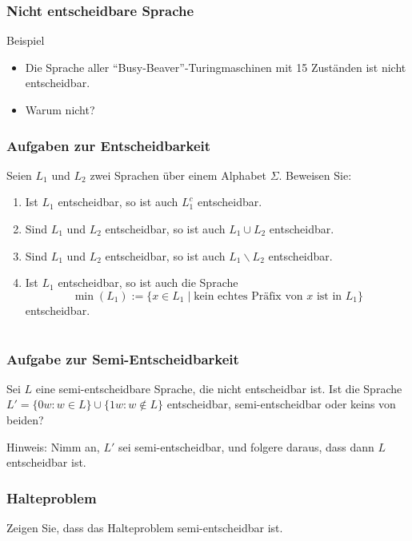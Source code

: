 \documentclass{beamer}
\begin{document}
\begin{frame}
 \frametitle{Nicht entscheidbare Sprache}
 \begin{block}{Beispiel}
 \begin{itemize}
  \item Die Sprache aller ``Busy-Beaver''-Turingmaschinen mit 15 Zuständen ist nicht entscheidbar.
  \item Warum nicht?
 \end{itemize}
 \end{block}
\end{frame}

\begin{frame}
\frametitle{Aufgaben zur Entscheidbarkeit}
 Seien $L_1$ und $L_2$ zwei Sprachen über einem Alphabet $\Sigma$.
Beweisen Sie:
\begin{enumerate}
\item Ist $L_1$ entscheidbar, so ist auch $L_1^c$ entscheidbar.
\item Sind $L_1$ und $L_2$ entscheidbar, so ist auch $L_1\cup L_2$ entscheidbar.
\item Sind $L_1$ und $L_2$ entscheidbar, so ist auch $L_1\backslash L_2$ entscheidbar.
\item Ist $L_1$ entscheidbar, so ist auch die Sprache 
$$\min(L_1):=\{x\in L_1\mid \text{kein echtes Präfix von $x$ ist in }L_1 \}$$
entscheidbar.
\end{enumerate}
\end{frame}

\section*{}
\begin{frame}
 \frametitle{Aufgabe zur Semi-Entscheidbarkeit}
Sei $L$ eine semi-entscheidbare Sprache, die nicht entscheidbar ist. Ist die
Sprache $L'=\{0w:w \in L\} \cup \{1w: w \not\in L\}$ entscheidbar,
semi-entscheidbar oder keins von beiden?

Hinweis: Nimm an, $L'$ sei semi-entscheidbar, und folgere daraus, dass
dann $L$ entscheidbar ist. 
\end{frame}


\begin{frame}
 \frametitle{Halteproblem}
 Zeigen Sie, dass das Halteproblem semi-entscheidbar ist.
\end{frame}
\end{document}

